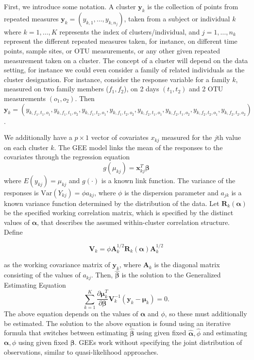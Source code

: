 \documentclass[12pt]{article}
\begin{document}
First, we introduce some notation. A cluster $\mathbf{y}_k$ is the collection of points from repeated measures $\mathbf{y}_k = (y_{k,1}, \ldots , y_{k,n_j})$, taken from a subject or individual $k$ where $k = 1, \ldots , K$ represents the index of clusters/individual, and $j = 1, \ldots , n_k$ represent the different repeated measures taken, for instance, on different  time points, sample sites, or OTU measurements, or any other given repeated measurement taken on a cluster.
The concept of a cluster will depend on the data setting, for instance we could even consider a family of related individuals as the cluster designation. For instance, consider the response variable for a family $k$, measured on two family members ($f_1,f_2$), on 2 days $(t_1,t_2)$ and 2 OTU measurements $(o_1,o_2)$. Then $\mathbf{y}_k = (y_{k, f_1,t_1,o_1}, y_{k, f_1,t_1,o_2}, y_{k, f_1,t_2,o_1}, y_{k, f_1,t_2,o_2},y_{k, f_2,t_1,o_1}, y_{k, f_2,t_1,o_2}, y_{k, f_2,t_2,o_1}, y_{k, f_2,t_2,o_2})$.


We additionally have a $p \times 1$ vector of covariates $x_{kj}$ measured for the $j$th value on each cluster $k$. The GEE model links the mean of the responses to the covariates through the regression equation
$$g(\mu_{kj}) = \mathbf{x}_{kj}^T\boldsymbol \beta$$
where $E(y_{kj}) = \mu_{kj}$ and $g(\cdot)$ is a known link function. The variance of the responses is $\text{Var}(Y_{kj}) = \phi a_{kj}$, where $\phi$ is the dispersion parameter and $a_{jk}$ is a known variance function determined by the distribution of the data. Let $\mathbf{R}_k(\boldsymbol\alpha)$ be the specified working correlation matrix, which is specified by the distinct values of $\boldsymbol\alpha$, that describes the assumed within-cluster correlation structure. Define
\begin{singlespace}
  \begin{equation*}
    \mathbf{V}_k = \phi \mathbf{A}_k^{1/2} \mathbf{R}_{k}(\boldsymbol\alpha)\mathbf{A}_k^{1/2}
  \end{equation*}
\end{singlespace}
as the working covariance matrix of $\mathbf{y}_k$, where $\mathbf{A}_k$ is the diagonal matrix consisting of the values of $a_{kj}$. Then, $\hat{\boldsymbol\beta}$ is the solution to the Generalized Estimating Equation
$$\sum_{k=1}^K \frac{\partial  \boldsymbol\mu_k^T }{\partial \boldsymbol\beta } \mathbf{V}_{k}^{-1} (\mathbf{y}_k - \boldsymbol{\mu}_k) = 0. $$
The above equation depends on the values of $\boldsymbol\alpha$ and $\phi$, so these must additionally be estimated. The solution to the above equation is found using an iterative formula that switches between estimating $\hat{\boldsymbol\beta}$ using given fixed $\hat{\boldsymbol\alpha}, \hat \phi$ and estimating $\boldsymbol\alpha,  \phi$ using given fixed $\boldsymbol\beta$. GEEs work without specifying the joint distribution of observations, similar to quasi-likelihood approaches.
\end{document}
